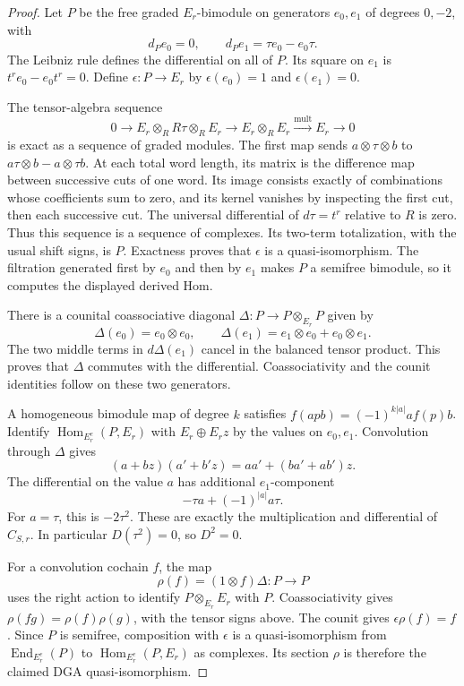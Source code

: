 \begin{proof}
Let $P$ be the free graded $E_r$-bimodule on generators
$e_0,e_1$ of degrees $0,-2$, with
\[
 d_Pe_0=0,\qquad d_Pe_1=\tau e_0-e_0\tau.
\]
The Leibniz rule defines the differential on all of $P$.
Its square on $e_1$ is $t^re_0-e_0t^r=0$.
Define $\epsilon:P\to E_r$ by
$\epsilon(e_0)=1$ and $\epsilon(e_1)=0$.

The tensor-algebra sequence
\[
 0\longrightarrow E_r\otimes_R R\tau\otimes_R E_r
 \longrightarrow E_r\otimes_R E_r
 \xrightarrow{\mathrm{mult}} E_r\longrightarrow0
\]
is exact as a sequence of graded modules.
The first map sends $a\otimes\tau\otimes b$ to
$a\tau\otimes b-a\otimes\tau b$.
At each total word length, its matrix is the difference map between
successive cuts of one word.
Its image consists exactly of combinations whose coefficients sum to zero,
and its kernel vanishes by inspecting the first cut, then each successive cut.
The universal differential of $d\tau=t^r$ relative to $R$ is zero.
Thus this sequence is a sequence of complexes.
Its two-term totalization, with the usual shift signs, is $P$.
Exactness proves that $\epsilon$ is a quasi-isomorphism.
The filtration generated first by $e_0$ and then by $e_1$ makes $P$
a semifree bimodule, so it computes the displayed derived Hom.

There is a counital coassociative diagonal
$\Delta:P\to P\otimes_{E_r}P$ given by
\[
 \Delta(e_0)=e_0\otimes e_0,\qquad
 \Delta(e_1)=e_1\otimes e_0+e_0\otimes e_1.
\]
The two middle terms in $d\Delta(e_1)$ cancel in the balanced tensor product.
This proves that $\Delta$ commutes with the differential.
Coassociativity and the counit identities follow on these two generators.

A homogeneous bimodule map of degree $k$ satisfies
$f(apb)=(-1)^{k|a|}af(p)b$.
Identify $\operatorname{Hom}_{E_r^e}(P,E_r)$ with $E_r\oplus E_rz$
by the values on $e_0,e_1$.
Convolution through $\Delta$ gives
\[
 (a+bz)(a'+b'z)=aa'+(ba'+ab')z.
\]
The differential on the value $a$ has additional $e_1$-component
\[
 -\tau a+(-1)^{|a|}a\tau.
\]
For $a=\tau$, this is $-2\tau^2$.
These are exactly the multiplication and differential of $C_{S,r}$.
In particular $D(\tau^2)=0$, so $D^2=0$.

For a convolution cochain $f$, the map
\[
 \rho(f)=(1\otimes f)\Delta:P\longrightarrow P
\]
uses the right action to identify $P\otimes_{E_r}E_r$ with $P$.
Coassociativity gives $\rho(fg)=\rho(f)\rho(g)$, with the tensor signs above.
The counit gives $\epsilon\rho(f)=f$.
Since $P$ is semifree, composition with $\epsilon$ is a
quasi-isomorphism from $\operatorname{End}_{E_r^e}(P)$ to
$\operatorname{Hom}_{E_r^e}(P,E_r)$ as complexes.
Its section $\rho$ is therefore the claimed DGA quasi-isomorphism.
\end{proof}

